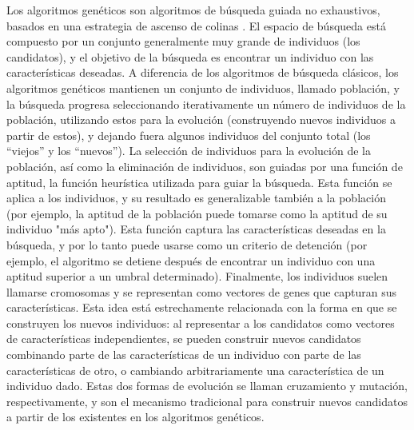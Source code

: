 Los algoritmos genéticos \cite{Goldberg:1989} son algoritmos de búsqueda guiada no exhaustivos, 
basados en una estrategia de ascenso de colinas \cite{Russell:2009}. El espacio de búsqueda está 
compuesto por un conjunto generalmente muy grande de individuos (los candidatos), y
el objetivo de la búsqueda es encontrar un individuo con las características deseadas. 
A diferencia de los algoritmos de búsqueda clásicos, los algoritmos genéticos mantienen un conjunto de individuos,
llamado población, y la búsqueda progresa seleccionando iterativamente un número de individuos de la población, 
utilizando estos para la evolución (construyendo nuevos individuos a partir de estos), 
y dejando fuera algunos individuos del conjunto total (los ``viejos'' y los ``nuevos'').
La selección de individuos para la evolución de la población, así como la eliminación de individuos, 
son guiadas por una función de aptitud, la función heurística utilizada para guiar la búsqueda. 
Esta función se aplica a los individuos, y su resultado es generalizable también a la población 
(por ejemplo, la aptitud de la población puede tomarse como la aptitud de su individuo "más apto").
Esta función captura las características deseadas en la búsqueda, y por lo tanto puede usarse como un 
criterio de detención (por ejemplo, el algoritmo se detiene después de encontrar un individuo con una 
aptitud superior a un umbral determinado). Finalmente, los individuos suelen llamarse cromosomas y 
se representan como vectores de genes que capturan sus características. Esta idea está estrechamente relacionada 
con la forma en que se construyen los nuevos individuos: al representar a los candidatos como vectores de 
características independientes, se pueden construir nuevos candidatos combinando parte de las características 
de un individuo con parte de las características de otro, o cambiando arbitrariamente una característica de 
un individuo dado. Estas dos formas de evolución se llaman cruzamiento y mutación, respectivamente, y son el 
mecanismo tradicional para construir nuevos candidatos a partir de los existentes en los algoritmos genéticos. 



